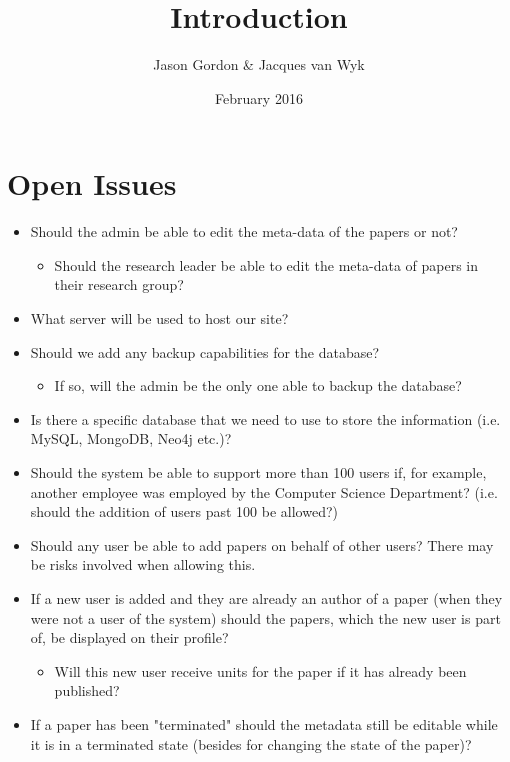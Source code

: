 \documentclass{article}
\title{Introduction}
\author{Jason Gordon & Jacques van Wyk}
\date{February 2016}
\begin{document}
\maketitle
\section{Open Issues}
	
\begin{itemize}	
\item Should the admin be able to edit the meta-data of the papers or not?
	\begin{itemize}
	\item Should the research leader be able to edit the meta-data of papers in their research group?
	\end{itemize}
\item What server will be used to host our site? 
\item Should we add any backup capabilities for the database?
	\begin{itemize}
	\item If so, will the admin be the only one able to backup the database?
	\end{itemize}
\item Is there a specific database that we need to use to store the information (i.e. MySQL, MongoDB, Neo4j etc.)?
\item Should the system be able to support more than 100 users if, for example, another employee was employed by the Computer Science Department? (i.e. should the addition of users past 100 be allowed?)
\item Should any user be able to add papers on behalf of other users? There may be risks involved when allowing this.
\item If a new user is added and they are already an author of a paper (when they were not a user of the system) should the papers, which the new user is part of, be displayed on their profile?
	\begin{itemize}
	\item Will this new user receive units for the paper if it has already been published?
	\end{itemize}
\item If a paper has been "terminated" should the metadata still be editable while it is in a terminated state (besides for changing the state of the paper)?
\end{itemize}
\end{document}
